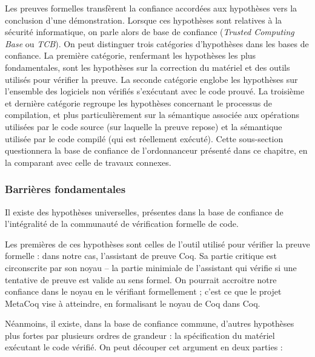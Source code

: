 		Les preuves formelles transfèrent la confiance accordées aux hypothèses vers la conclusion d'une démonstration. Lorsque ces hypothèses sont relatives à la sécurité informatique, on parle alors de base de confiance (\emph{Trusted Computing Base} ou \emph{TCB}). On peut distinguer trois catégories d'hypothèses dans les bases de confiance. La première catégorie, renfermant les hypothèses les plus fondamentales, sont les hypothèses sur la correction du matériel et des outils utilisés pour vérifier la preuve. La seconde catégorie englobe les hypothèses sur l'ensemble des logiciels non vérifiés s'exécutant avec le code prouvé. La troisième et dernière catégorie regroupe les hypothèses concernant le processus de compilation, et plus particulièrement sur la sémantique associée aux opérations utilisées par le code source (sur laquelle la preuve repose) et la sémantique utilisée par le code compilé (qui est réellement exécuté). Cette sous-section questionnera la base de confiance de l'ordonnanceur présenté dans ce chapitre, en la comparant avec celle de travaux connexes.

\subsubsection{Barrières fondamentales}

Il existe des hypothèses universelles, présentes dans la base de confiance de l'intégralité de la communauté de vérification formelle de code.

Les premières de ces hypothèses sont celles de l'outil utilisé pour vérifier la preuve formelle : dans notre cas, l'assistant de preuve Coq. Sa partie critique est circonscrite par son noyau -- la partie minimiale de l'assistant qui vérifie si une tentative de preuve est valide au sens formel. On pourrait accroitre notre confiance dans le noyau en le vérifiant formellement ; c'est ce que le projet MetaCoq \cite{metacoq} vise à atteindre, en formalisant le noyau de Coq dans Coq.

Néanmoins, il existe, dans la base de confiance commune, d'autres hypothèses plus fortes par plusieurs ordres de grandeur : la spécification du matériel exécutant le code vérifié. On peut découper cet argument en deux parties :

